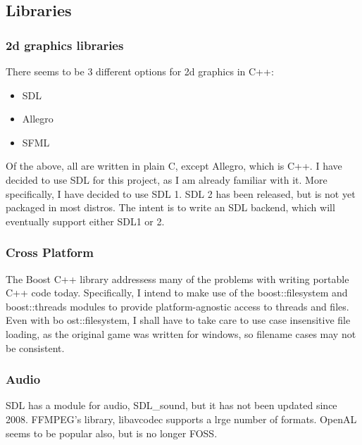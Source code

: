    	\subsection{Libraries}
       	\subsubsection{2d graphics libraries}
    	There seems to be 3 different options for 2d graphics in C++:
    	\begin{itemize}
    	    \item{SDL}
    	    \item{Allegro}
    	    \item{SFML}
    	\end{itemize}
    	
    	Of the above, all are written in plain C, except Allegro, which is C++.
    	I have decided to use SDL for this project, as I am already familiar with it.
    	More specifically, I have decided to use SDL 1.
    	SDL 2 has been released, but is not yet packaged in most distros. 
    	The intent is to write an SDL backend, which will eventually support either SDL1 or 2.
    	
    	\subsubsection{Cross Platform}
        The Boost C++ library addressess many of the problems with writing portable C++ code today.
        Specifically, I intend to make use of the boost::filesystem and boost::threads modules to provide platform-agnostic access to threads and files.
        Even with bo	ost::filesystem, I shall have to take care to use case insensitive file loading, as the original game was written for windows, so filename cases may not be consistent.
        
        \subsubsection{Audio}
        SDL has a module for audio, SDL\_sound\cite{sdls}, but it has not been updated since 2008.
        FFMPEG's library, libavcodec\cite{libavcodec} supports a lrge number of formats.
        OpenAL seems to be popular also, but is no longer FOSS.